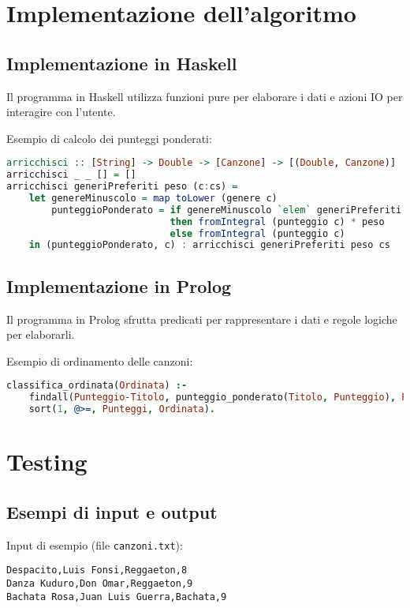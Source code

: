 \documentclass[a4paper,11pt]{article}
\begin{document}
\section{Implementazione dell'algoritmo}

\subsection{Implementazione in Haskell}
Il programma in Haskell utilizza funzioni pure per elaborare i dati e azioni IO per interagire con l'utente.

Esempio di calcolo dei punteggi ponderati:
\begin{lstlisting}[language=Haskell,caption=Calcolo dei punteggi ponderati in Haskell]
arricchisci :: [String] -> Double -> [Canzone] -> [(Double, Canzone)]
arricchisci _ _ [] = []
arricchisci generiPreferiti peso (c:cs) =
    let genereMinuscolo = map toLower (genere c)
        punteggioPonderato = if genereMinuscolo `elem` generiPreferiti
                             then fromIntegral (punteggio c) * peso
                             else fromIntegral (punteggio c)
    in (punteggioPonderato, c) : arricchisci generiPreferiti peso cs
\end{lstlisting}

\subsection{Implementazione in Prolog}
Il programma in Prolog sfrutta predicati per rappresentare i dati e regole logiche per elaborarli.

Esempio di ordinamento delle canzoni:
\begin{lstlisting}[language=Prolog,caption=Ordinamento delle canzoni in Prolog]
classifica_ordinata(Ordinata) :-
    findall(Punteggio-Titolo, punteggio_ponderato(Titolo, Punteggio), Punteggi),
    sort(1, @>=, Punteggi, Ordinata).
\end{lstlisting}

\section{Testing}

\subsection{Esempi di input e output}
Input di esempio (file \texttt{canzoni.txt}):
\begin{verbatim}
Despacito,Luis Fonsi,Reggaeton,8
Danza Kuduro,Don Omar,Reggaeton,9
Bachata Rosa,Juan Luis Guerra,Bachata,9
\end{verbatim}
\end{document}
